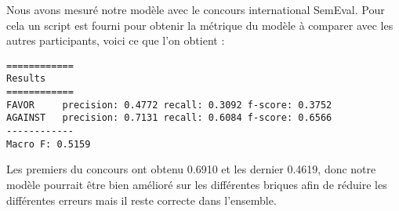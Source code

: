 \par Nous avons mesuré notre modèle avec le concours international SemEval. Pour cela un script est fourni pour obtenir la métrique du modèle à comparer avec les autres participants, voici ce que l'on obtient : \\

\begin{verbatim}
============
Results
============
FAVOR     precision: 0.4772 recall: 0.3092 f-score: 0.3752
AGAINST   precision: 0.7131 recall: 0.6084 f-score: 0.6566
------------
Macro F: 0.5159
\end{verbatim}

\par Les premiers du concours ont obtenu 0.6910 et les dernier 0.4619, donc notre modèle pourrait être bien amélioré sur les différentes briques afin de réduire les différentes erreurs mais il reste correcte dans l'ensemble. 